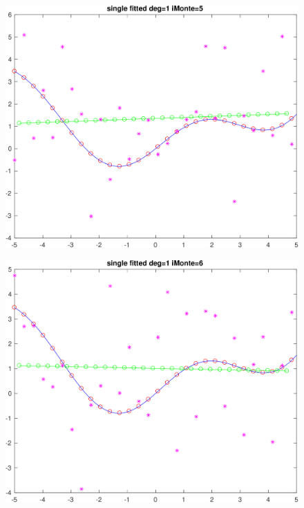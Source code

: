 \begin{figure}[h!]
\centering\includegraphics[scale=0.1]{single_poly_d_1_iMonte_5.png}
\end{figure}


\begin{figure}[h!]
\centering\includegraphics[scale=0.1]{single_poly_d_1_iMonte_6.png}
\end{figure}

